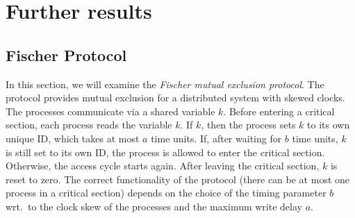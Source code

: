 \documentclass{llncs}
\begin{document}
\section{Further results} \label{sec:results}
\subsection{Fischer Protocol}
In this section, we will examine the \emph{Fischer mutual exclusion
  protocol}. The protocol provides mutual exclusion for a distributed
system with skewed clocks. The processes communicate via a shared
variable $k$. Before entering a critical section, each process reads
the variable $k$. If $k$, then the process sets $k$ to its own unique
ID, which takes at most $a$ time units. If, after waiting for $b$ time
units, $k$ is still set to its own ID, the process is allowed to enter
the critical section. Otherwise, the access cycle starts again. After
leaving the critical section, $k$ is reset to zero. The correct
functionality of the protocol (there can be at most one process in a
critical section) depends on the choice of the timing parameter $b$
wrt.~to the clock skew of the processes and the maximum write delay
$a$.
\end{document}
